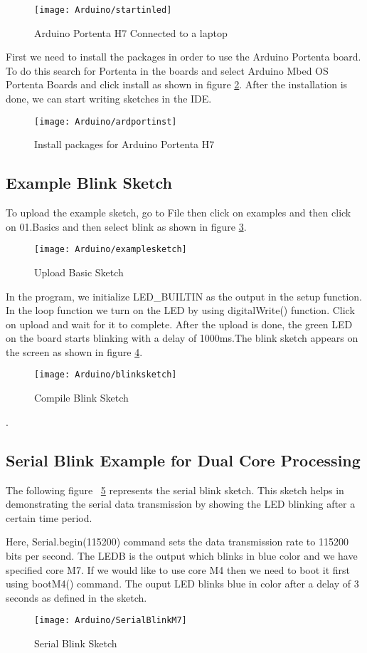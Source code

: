 \begin{figure}
	\centering
	\texttt{[image: Arduino/startinled]}
	\caption{Arduino Portenta H7 Connected to a laptop  }
	\label{figure 5.1}
\end{figure}
First we need to install the packages in order to use the Arduino Portenta board. To do this search for Portenta in the boards and select Arduino Mbed OS Portenta Boards and click install as shown in figure \ref{figure 5.2}. After the installation is done, we can start writing sketches in the IDE.
\begin{figure}[H]
	\centering
	\texttt{[image: Arduino/ardportinst]}
	\caption{Install packages for Arduino Portenta H7}
	\label{figure 5.2}
\end{figure}
\subsection{Example Blink Sketch}
To upload the example sketch, go to File then click on examples and then click on 01.Basics and then select blink as shown in figure \ref{figure 5.3}.
\begin{figure}[H]
	\centering
	\texttt{[image: Arduino/examplesketch]}
	\caption{Upload Basic Sketch}
	\label{figure 5.3}
\end{figure}

In the program, we initialize LED\_BUILTIN as the output in the setup function. In the loop function   we turn on the LED by using digitalWrite() function. Click on upload and wait for it to complete. After the upload is done, the green LED on the board starts blinking with a delay of 1000ms.The blink sketch appears on the screen as shown in figure \ref{figure 5.4}.


\begin{figure}[H]
	\centering
	\texttt{[image: Arduino/blinksketch]}
	\caption{Compile Blink Sketch}
	\label{figure 5.4}
\end{figure}
.
\subsection{Serial Blink Example for Dual Core Processing}

The following figure~ \ref{figure 5.5} represents the serial blink sketch. This sketch helps in demonstrating the serial data transmission by showing the LED blinking after a certain time period. 

Here, Serial.begin(115200) command sets the data transmission rate to 115200 bits per second. The LEDB is the output which blinks in blue color and we have specified core M7. If we would like to use core M4 then we need to boot it first using bootM4() command. The ouput LED blinks blue in color after a delay of 3 seconds as defined in the sketch.
\begin{figure}[H]
	\centering
	\texttt{[image: Arduino/SerialBlinkM7]}
	\caption{Serial Blink Sketch}
	\label{figure 5.5}
\end{figure}

